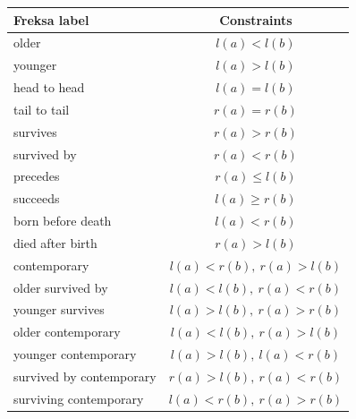 \documentclass[a4paper,12pt,leqno]{article}
\begin{document}
\begin{center}
	\begin{tabular}[h!]{|l c|}
		\hline
		\textbf{Freksa label} & \textbf{Constraints}\\
		\hline
		older & $l(a) < l(b)$\\
		younger & $l(a) > l(b)$\\
		head to head & $l(a) = l(b)$\\
		tail to tail & $r(a) = r(b)$\\
		survives & $r(a) > r(b)$\\
		survived by & $r(a) < r(b)$\\
		precedes & $r(a) \le l(b)$\\
		succeeds & $l(a) \ge r(b)$\\
		born before death & $l(a) < r(b)$\\
		died after birth & $r(a) > l(b)$\\
		contemporary & $l(a) < r(b),~ r(a) > l(b)$\\
		older survived by & $l(a) < l(b),~ r(a) < r(b)$\\
		younger survives & $l(a) > l(b),~ r(a) > r(b)$\\
		older contemporary & $l(a) < l(b),~ r(a) > l(b)$\\
		younger contemporary & $l(a) > l(b),~ l(a) < r(b)$\\
		survived by contemporary & $r(a) > l(b),~ r(a) < r(b)$\\
		surviving contemporary & $l(a) < r(b),~ r(a) > r(b)$\\
		\hline
	\end{tabular}
	\label{tab:freksa-constraints}
\end{center}
\end{document}
